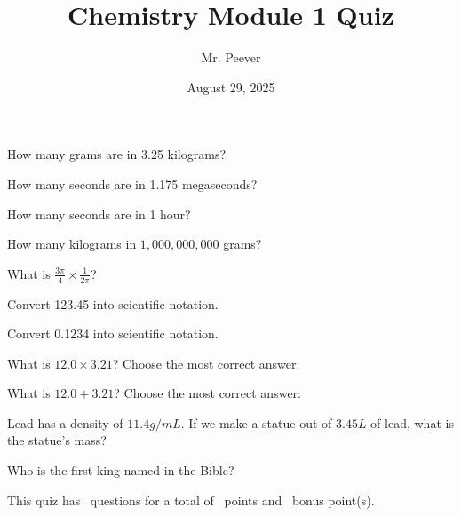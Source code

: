 \documentclass[11pt,addpoints]{exam}   	%
\title{Chemistry Module 1 Quiz}
\author{Mr. Peever}
\date{August 29, 2025}
\begin{document}
\maketitle

\pointsinrightmargin

\begin{center}
\end{center}
\vspace{0.1in}
\vspace{0.2in}

\begin{questions}

\question[1]
How many grams are in 3.25 kilograms?

\question[1]
How many seconds are in 1.175 megaseconds?

\question[1]
How many seconds are in 1 hour?

\question[1]
How many kilograms in $1,000,000,000$ grams?

\question[1]
What is  $\frac{3 \pi}{4} \times \frac{1}{2 \pi}$?

\question[1]
Convert 123.45 into scientific notation.

\question[1]
Convert 0.1234 into scientific notation.

\question[1]
What is $ 12.0 \times 3.21 $? Choose the most correct answer:

\begin{choices}
\end{choices}
\vspace{.2in}

\pagebreak

\question[1]
What is $ 12.0 + 3.21 $? Choose the most correct answer:

\begin{choices}
\end{choices}


\question[1]
Lead has a density of $11.4 g/mL$. If we make a statue out of $3.45 L$ of lead, what is the statue's mass?

\vspace{1in}
\bonusquestion[1]
Who is the first king named in the Bible?

\end{questions}

\vspace{2in}

\begin{center}
This quiz has \numquestions\ questions for a total of \numpoints\ points and \numbonuspoints\ bonus point(s).
\end{center}
\end{document}
